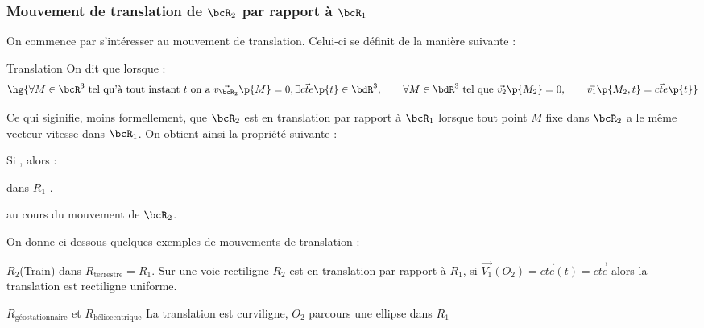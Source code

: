     \subsubsection{Mouvement de translation de $\bcR_2$ par rapport à $\bcR_1$}
    
    On commence par s'intéresser au mouvement de translation. Celui-ci se définit de la manière suivante :

    \begin{definition}{Translation}{}
        On dit que  lorsque :
        \[ \hg{\forall M \in \bcR^3 \ \text{tel qu'à tout instant} \ t \ \text{on a} \  \vec{v_{\bcR_2}}\p{M} = 0, \exists \vec{cte}\p{t} \in \bdR^3,\qquad \forall M \in \bdR^3 \ \text{tel que} \ \vec{v_2}\p{M_2} = 0,\qquad \vec{v_1}\p{M_2, t} = \vec{cte}\p{t}}\]
    \end{definition}
    Ce qui siginifie, moins formellement, que $\bcR_2$ est en translation par rapport à $\bcR_1$ lorsque tout point $M$ fixe dans $\bcR_2$ a le même vecteur vitesse dans $\bcR_1$. 
    On obtient ainsi la propriété suivante :
    \begin{property}{}{}
        Si , alors :
        \begin{psse}
            \itast {} dans $R_1$ .
            
            \itast {} au cours du mouvement de $\bcR_2$.
        \end{psse}
    \end{property}
    
    On donne ci-dessous quelques exemples de mouvements de translation :

    \begin{example}{}{}
        \begin{enumerate}
            \itt \(R_2\)(Train) dans \(R_\text{terrestre} = R_1\). Sur une voie rectiligne \(R_2\) est 
            en translation par rapport à \(R_1\), si \(\vec{V_1}(O_2) = \vec{cte}(t) = \vec{cte}\) alors 
            la translation est rectiligne uniforme.

            \itt \(R_{\text{géostationnaire}}\) et \(R_\text{héliocentrique}\)
            La translation est curviligne, \(O_2\) parcours une ellipse dans \(R_1\)
        \end{enumerate}
    \end{example}

